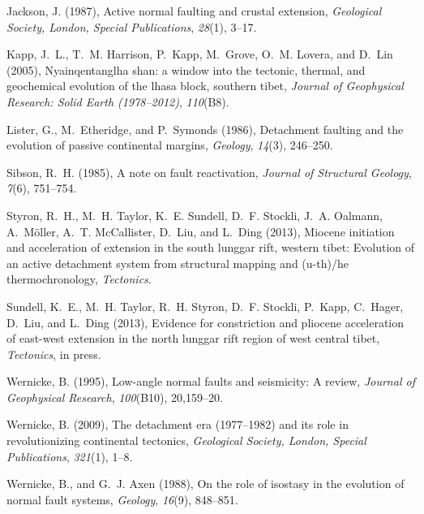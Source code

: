 \documentclass[twocolumn,grl]{AGUTeX}
\begin{document}
\begin{article}
\begin{thebibliography}{23}
Jackson, J. (1987), Active normal faulting and crustal extension,
  \textit{Geological Society, London, Special Publications}, \textit{28}(1),
  3--17.

Kapp, J.~L., T.~M. Harrison, P.~Kapp, M.~Grove, O.~M. Lovera, and D.~Lin
  (2005), Nyainqentanglha shan: a window into the tectonic, thermal, and
  geochemical evolution of the lhasa block, southern tibet, \textit{Journal of
  Geophysical Research: Solid Earth (1978--2012)}, \textit{110}(B8).

Lister, G., M.~Etheridge, and P.~Symonds (1986), Detachment faulting and the
  evolution of passive continental margins, \textit{Geology}, \textit{14}(3),
  246--250.

Sibson, R.~H. (1985), A note on fault reactivation, \textit{Journal of
  Structural Geology}, \textit{7}(6), 751--754.

Styron, R.~H., M.~H. Taylor, K.~E. Sundell, D.~F. Stockli, J.~A. Oalmann,
  A.~M{\"o}ller, A.~T. McCallister, D.~Liu, and L.~Ding (2013), Miocene
  initiation and acceleration of extension in the south lunggar rift, western
  tibet: Evolution of an active detachment system from structural mapping and
  (u-th)/he thermochronology, \textit{Tectonics}.

Sundell, K.~E., M.~H. Taylor, R.~H. Styron, D.~F. Stockli, P.~Kapp, C.~Hager,
  D.~Liu, and L.~Ding (2013), Evidence for constriction and pliocene
  acceleration of east-west extension in the north lunggar rift region of west
  central tibet, \textit{Tectonics}, in press.

Wernicke, B. (1995), Low-angle normal faults and seismicity: A review,
  \textit{Journal of Geophysical Research}, \textit{100}(B10), 20,159--20.

Wernicke, B. (2009), The detachment era (1977--1982) and its role in
  revolutionizing continental tectonics, \textit{Geological Society, London,
  Special Publications}, \textit{321}(1), 1--8.

Wernicke, B., and G.~J. Axen (1988), On the role of isostasy in the evolution
  of normal fault systems, \textit{Geology}, \textit{16}(9), 848--851.

\end{thebibliography}



\end{article}


%
%
\end{document}
